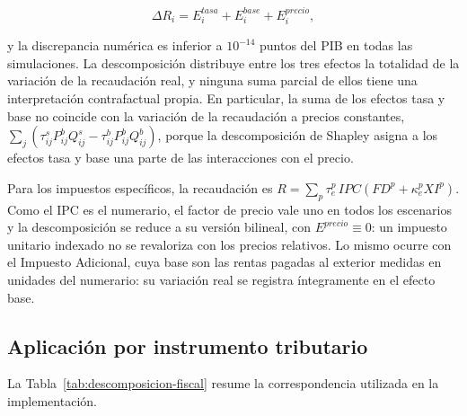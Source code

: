 \documentclass[11pt]{article}
\begin{document}
\[
\Delta R_i=E_i^{tasa}+E_i^{base}+E_i^{precio},
\]

y la discrepancia numérica es inferior a \(10^{-14}\) puntos del PIB en todas las simulaciones. La descomposición distribuye entre los tres efectos la totalidad de la variación de la recaudación real, y ninguna suma parcial de ellos tiene una interpretación contrafactual propia. En particular, la suma de los efectos tasa y base no coincide con la variación de la recaudación a precios constantes, \(\sum_j\left(\tau^{s}_{ij}P^{b}_{ij}Q^{s}_{ij}-\tau^{b}_{ij}P^{b}_{ij}Q^{b}_{ij}\right)\), porque la descomposición de Shapley asigna a los efectos tasa y base una parte de las interacciones con el precio.

Para los impuestos específicos, la recaudación es $R=\sum_{p}\tau_{e}^{p}\,IPC\left(FD^{p}+\kappa_{e}^{p}XI^{p}\right)$. Como el IPC es el numerario, el factor de precio vale uno en todos los escenarios y la descomposición se reduce a su versión bilineal, con $E^{precio}\equiv 0$: un impuesto unitario indexado no se revaloriza con los precios relativos. Lo mismo ocurre con el Impuesto Adicional, cuya base son las rentas pagadas al exterior medidas en unidades del numerario: su variación real se registra íntegramente en el efecto base.

\subsection{Aplicación por instrumento tributario}

La Tabla~\ref{tab:descomposicion-fiscal} resume la correspondencia utilizada en la implementación.
\end{document}
